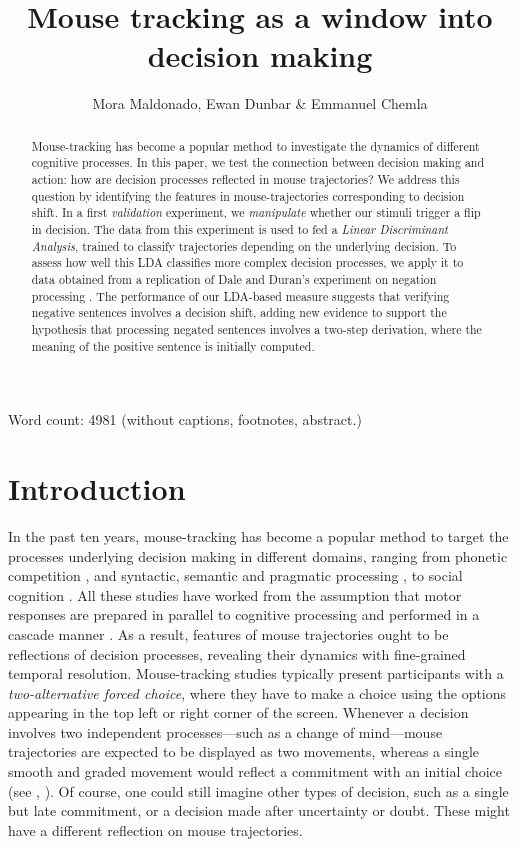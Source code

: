 \documentclass{article}
\title{Mouse tracking as a window into decision making}
\author{Mora Maldonado, Ewan Dunbar \& Emmanuel Chemla}
\begin{document}
\maketitle

\begin{abstract}
Mouse-tracking has become a popular method to investigate the dynamics of different cognitive processes. In this paper, we test the connection between decision making and action: how are decision processes reflected in mouse trajectories? 
We address this question by identifying the features in mouse-trajectories corresponding to decision shift. 
In a first \emph{validation} experiment, we \emph{manipulate} whether our stimuli trigger a flip in decision.
The data from this experiment is used to fed a \emph{Linear Discriminant Analysis}, trained to classify trajectories depending on the underlying decision.
To assess how well this LDA classifies more complex decision processes, we apply it to data obtained from a replication of Dale and Duran's experiment on negation processing \citep{Dale2011}.  
The performance of our LDA-based measure suggests that verifying negative sentences involves a decision shift, adding new evidence to support the hypothesis that processing negated sentences involves a two-step derivation, where the meaning of the positive sentence is initially computed.  
\end{abstract}


Word count: 4981 (without captions, footnotes, abstract.)

\section{Introduction}

In the past ten years, mouse-tracking has become a popular method to target the processes underlying decision making in different domains, ranging from phonetic competition \citep{Spivey2005,cranford2017mouse}, and syntactic, semantic and pragmatic processing \citep[among others]{Farmer2007, Dale2011, tomlinson2013possibly,xiao2014semantic,sauerland2015tracking,xiao2017role}, to social cognition \citep{Freeman2010,Freeman2011,freeman2016more}.
%
All these studies have worked from the assumption that motor responses are prepared in parallel to cognitive processing and performed in a cascade manner \citep{song2006role,Song2009,Freeman2010,spivey2006continuous,Hehman2014}.
%
As a result, features of mouse trajectories ought to be reflections of  decision processes, revealing their dynamics with fine-grained temporal resolution. 
%
Mouse-tracking studies typically present participants with a \emph{two-alternative forced choice}, where they have to make a choice using the options appearing in the top left or right corner of the screen. Whenever a decision involves two independent processes---such as a change of mind---mouse trajectories are expected to be displayed as two movements, whereas a single smooth and graded movement would reflect a commitment with an initial choice (see , \citealp{Wojnowicz2009}).
%
Of course, one could still imagine other types of decision, such as a single but late commitment, or a decision made after uncertainty or doubt. These might have a different reflection on mouse trajectories.
\end{document}
